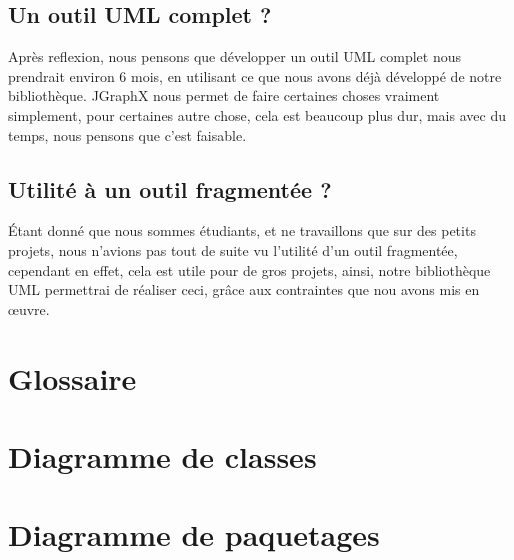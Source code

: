 \documentclass[12pt,a4paper,oneside]{book}
\begin{document}
	\section{Un outil UML complet ?}
	Après reflexion, nous pensons que développer un outil UML complet nous prendrait environ 6 mois, 
	en utilisant ce que nous avons déjà développé de notre bibliothèque. JGraphX nous permet de faire certaines choses vraiment simplement, pour certaines autre chose, cela
	est beaucoup plus dur, mais avec du temps, nous pensons que c'est faisable. 
	\section{Utilité à un outil fragmentée ?}
	Étant donné que nous sommes étudiants, et ne travaillons que sur des petits projets, nous n'avions pas tout de suite vu l'utilité d'un outil fragmentée, cependant
en effet, cela est utile pour de gros projets, ainsi, notre bibliothèque UML permettrai de réaliser ceci, grâce aux contraintes que nou avons mis en \oe{}uvre.
	
	\closeout\glossaireVar
	\appendix
	\chapter{Glossaire}\label{glossaire}
	\nouveauChapitre
	\begin{sortedlist}
		
	\end{sortedlist}
	\chapter{Diagramme de classes}
	\nouveauChapitre
	
	\chapter{Diagramme de paquetages}
	\nouveauChapitre
	
\end{document}
